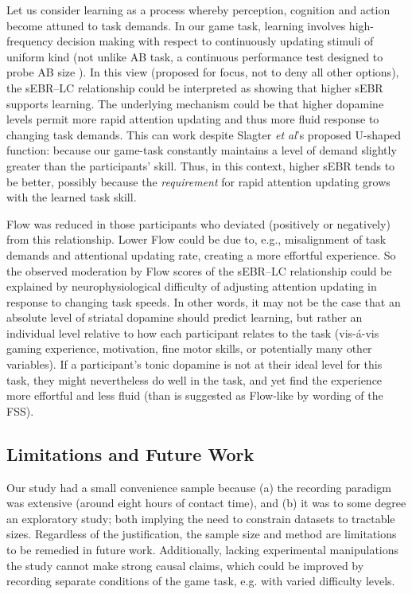\documentclass[fleqn,10pt]{wlscirep}
\begin{document}
Let us consider learning as a process whereby perception, cognition and action become attuned to task demands. In our game task, learning involves high-frequency decision making with respect to continuously updating stimuli of uniform kind (not unlike AB task, a continuous performance test designed to probe AB size \cite{Slagter2012}). In this view (proposed for focus, not to deny all other options), the sEBR--LC relationship could be interpreted as showing that higher sEBR supports learning. The underlying mechanism could be that higher dopamine levels permit more rapid attention updating and thus more fluid response to changing task demands. This can work despite Slagter {\it et al}'s \cite{Slagter2012} proposed U-shaped function: because our game-task constantly maintains a level of demand slightly greater than the participants' skill. Thus, in this context, higher sEBR tends to be better, possibly because the {\it requirement} for rapid attention updating grows with the learned task skill.

Flow was reduced in those participants who deviated (positively or negatively) from this relationship. Lower Flow could be due to, e.g., misalignment of task demands and attentional updating rate, creating a more effortful experience. So the observed moderation by Flow scores of the sEBR--LC relationship could be explained by neurophysiological difficulty of adjusting attention updating in response to changing task speeds. In other words, it may not be the case that an absolute level of striatal dopamine should predict learning, but rather an individual level relative to how each participant relates to the task (vis-\'{a}-vis gaming experience, motivation, fine motor skills, or potentially many other variables). If a participant's tonic dopamine is not at their ideal level for this task, they might nevertheless do well in the task, and yet find the experience more effortful and less fluid (than is suggested as Flow-like by wording of the FSS).


\subsection*{Limitations and Future Work}
Our study had a small convenience sample because (a) the recording paradigm was extensive (around eight hours of contact time), and (b) it was to some degree an exploratory study; both implying the need to constrain datasets to tractable sizes. Regardless of the justification, the sample size and method are limitations to be remedied in future work. Additionally, lacking experimental manipulations the study cannot make strong causal claims, which could be improved by recording separate conditions of the game task, e.g. with varied difficulty levels.
\end{document}

